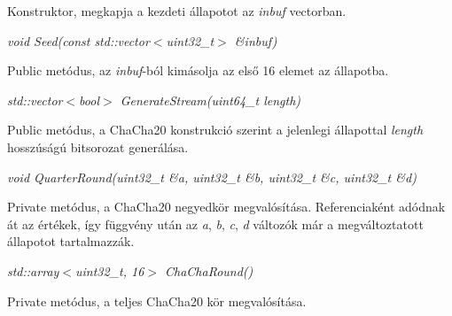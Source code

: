 \documentclass[12pt]{article}
\begin{document}
Konstruktor, megkapja a kezdeti állapotot az \textit{inbuf} vectorban.

\textit{void Seed(const std::vector$<$uint32\_t$>$ \&inbuf)}

Public metódus, az \textit{inbuf}-ból kimásolja az első 16 elemet az állapotba.

\textit{std::vector$<$bool$>$ GenerateStream(uint64\_t length)}

Public metódus, a ChaCha20 konstrukció szerint a jelenlegi állapottal \textit{length} hosszúságú bitsorozat generálása.

\textit{void QuarterRound(uint32\_t \&a, uint32\_t \&b, uint32\_t \&c, uint32\_t \&d)}

Private metódus, a ChaCha20 negyedkör megvalósítása. Referenciaként adódnak át az értékek, így függvény után az \textit{a}, \textit{b}, \textit{c}, \textit{d} változók már a megváltoztatott állapotot tartalmazzák.

\textit{std::array$<$uint32\_t, 16$>$ ChaChaRound()}

Private metódus, a teljes ChaCha20 kör megvalósítása.
\end{document}
